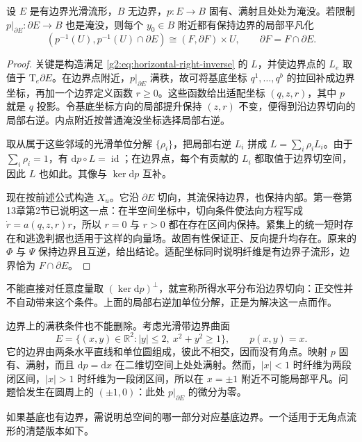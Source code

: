 \begin{proposition}\label{g2:prop:ehresmann-source-boundary}
	设 \(E\) 是有边界光滑流形，\(B\) 无边界，\(p:E\to B\) 固有、满射且处处为淹没。若限制 \(p|_{\partial E}:\partial E\to B\) 也是淹没，则每个 \(y_0\in B\) 附近都有保持边界的局部平凡化
	\[
		(p^{-1}(U),p^{-1}(U)\cap\partial E)
		\cong(F,\partial F)\times U,
		\qquad \partial F=F\cap\partial E.
	\]
\end{proposition}
\begin{proof}
	关键是构造满足 \eqref{g2:eq:horizontal-right-inverse} 的 \(L\)，并使边界点的 \(L_e\) 取值于 \(\mathrm{T}_e\partial E\)。在边界点附近，\(p|_{\partial E}\) 满秩，故可将基底坐标 \(q^1,\ldots,q^b\) 的拉回补成边界坐标，再加一个边界定义函数 \(r\geq0\)。这些函数给出适配坐标 \((q,z,r)\)，其中 \(p\) 就是 \(q\) 投影。令基底坐标方向的局部提升保持 \((z,r)\) 不变，便得到沿边界切向的局部右逆。内点附近按普通淹没坐标选择局部右逆。

	取从属于这些邻域的光滑单位分解 \(\{\rho_i\}\)，把局部右逆 \(L_i\) 拼成 \(L=\sum_i\rho_iL_i\)。由于 \(\sum_i\rho_i=1\)，有 \(\mathrm{d}p\circ L=\operatorname{id}\)；在边界点，每个有贡献的 \(L_i\) 都取值于边界切空间，因此 \(L\) 也如此。其像与 \(\ker\mathrm{d}p\) 互补。

	现在按前述公式构造 \(X_u\)。它沿 \(\partial E\) 切向，其流保持边界，也保持内部。第一卷第13章第2节已说明这一点：在半空间坐标中，切向条件使法向方程写成 \(\dot r=a(q,z,r)r\)，所以 \(r=0\) 与 \(r>0\) 都在存在区间内保持。紧集上的统一短时存在和逃逸判据也适用于这样的向量场。故固有性保证正、反向提升均存在。原来的 \(\Phi\) 与 \(\Psi\) 保持边界且互逆，给出结论。适配坐标同时说明纤维是有边界子流形，边界恰为 \(F\cap\partial E\)。
\end{proof}

不能直接对任意度量取 \((\ker\mathrm{d}p)^\perp\)，就宣称所得水平分布沿边界切向：正交性并不自动带来这个条件。上面的局部右逆加单位分解，正是为解决这一点而作。

\ProseParagraphBreak

边界上的满秩条件也不能删除。考虑光滑带边界曲面
\[
	E=\{(x,y)\in\mathbb R^2:|y|\leq2,\ x^2+y^2\geq1\},
	\qquad p(x,y)=x.
\]
它的边界由两条水平直线和单位圆组成，彼此不相交，因而没有角点。映射 \(p\) 固有、满射，而且 \(\mathrm{d}p=\mathrm{d}x\) 在二维切空间上处处满射。然而，\(|x|<1\) 时纤维为两段闭区间，\(|x|>1\) 时纤维为一段闭区间，所以在 \(x=\pm1\) 附近不可能局部平凡。问题恰发生在圆周上的 \((\pm1,0)\)：此处 \(p|_{\partial E}\) 的微分为零。

\ProseParagraphBreak

如果基底也有边界，需说明总空间的哪一部分对应基底边界。一个适用于无角点流形的清楚版本如下。

